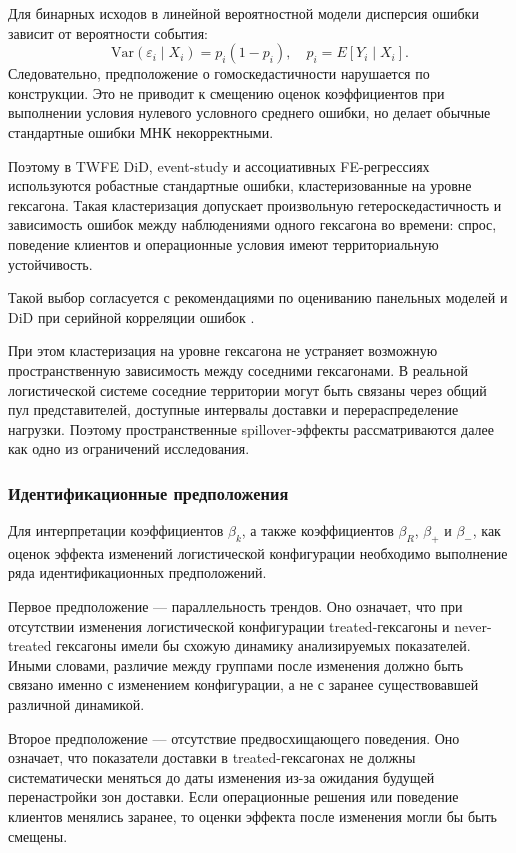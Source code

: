 \documentclass[14pt,a4paper]{extarticle}
\begin{document}
Для бинарных исходов в линейной вероятностной модели дисперсия ошибки зависит от вероятности события:
\[
\mathrm{Var}(\varepsilon_i \mid X_i)
=
p_i(1-p_i),
\quad
p_i = E[Y_i \mid X_i].
\]
Следовательно, предположение о гомоскедастичности нарушается по конструкции. Это не приводит к смещению оценок коэффициентов при выполнении условия нулевого условного среднего ошибки, но делает обычные стандартные ошибки МНК некорректными.

Поэтому в TWFE DiD, event-study и ассоциативных FE-регрессиях используются
робастные стандартные ошибки, кластеризованные на уровне гексагона. Такая
кластеризация допускает произвольную гетероскедастичность и зависимость ошибок
между наблюдениями одного гексагона во времени: спрос, поведение клиентов и
операционные условия имеют территориальную устойчивость.

Такой выбор согласуется с рекомендациями по оцениванию панельных моделей
и DiD при серийной корреляции ошибок
\cite{wooldridge2010,bertrand2004}.

При этом кластеризация на уровне гексагона не устраняет возможную пространственную зависимость между соседними гексагонами. В реальной логистической системе соседние территории могут быть связаны через общий пул представителей, доступные интервалы доставки и перераспределение нагрузки. Поэтому пространственные spillover-эффекты рассматриваются далее как одно из ограничений исследования.

\subsubsection{Идентификационные предположения}

Для интерпретации коэффициентов \(\beta_k\), а также коэффициентов \(\beta_R\), \(\beta_+\) и \(\beta_-\), как оценок эффекта изменений логистической конфигурации необходимо выполнение ряда идентификационных предположений.

Первое предположение --- параллельность трендов. Оно означает, что при отсутствии изменения логистической конфигурации treated-гексагоны и never-treated гексагоны имели бы схожую динамику анализируемых показателей. Иными словами, различие между группами после изменения должно быть связано именно с изменением конфигурации, а не с заранее существовавшей различной динамикой.

Второе предположение --- отсутствие предвосхищающего поведения. Оно означает, что показатели доставки в treated-гексагонах не должны систематически меняться до даты изменения из-за ожидания будущей перенастройки зон доставки. Если операционные решения или поведение клиентов менялись заранее, то оценки эффекта после изменения могли бы быть смещены.
\end{document}
